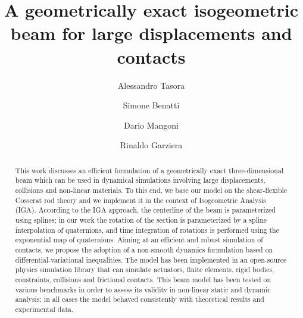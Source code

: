 \documentclass[review]{elsarticle}
\def\avect#1{{\boldsymbol{#1}}}
\def\amatr#1{{\boldsymbol{#1}}}
\begin{document}


\title{A geometrically exact isogeometric beam for large displacements and contacts}

\author{Alessandro Tasora}
\author{Simone Benatti}
\author{Dario Mangoni}
\author{Rinaldo Garziera}
\address{Universit\`a degli Studi di Parma, \\Dpt. of Engineering and Architecture\\Parco Area delle Scienze, 181/A, 43124 Parma, Italy }






\begin{abstract} 
This work discusses an efficient formulation of a geometrically exact three-dimensional beam which can be used in dynamical simulations involving large displacements, collisions and non-linear materials. To this end, we base our model on the shear-flexible Cosserat rod theory and we implement it in the context of Isogeometric Analysis (IGA). 
According to the IGA approach, the centerline of the beam is parameterized using splines; in our work the rotation of the section is parameterized by a spline interpolation of quaternions, and time integration of rotations is performed using the exponential map of quaternions. Aiming at an efficient and robust simulation of contacts, we propose the adoption of a non-smooth dynamics formulation based on differential-variational inequalities. 
The model has been implemented in an open-source physics simulation library that can simulate actuators, finite elements, rigid bodies, constraints, collisions and frictional contacts. 
This beam model has been tested on various benchmarks in order to assess its validity in non-linear static and dynamic analysis; in all cases the model behaved consistently with theoretical results and experimental data. 
\end{abstract}
\end{document}
